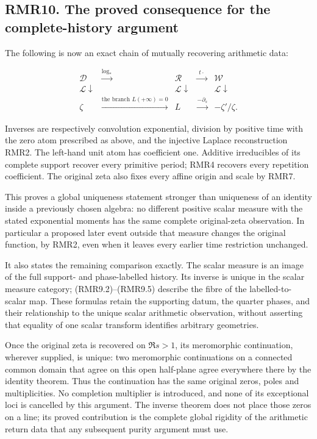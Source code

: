 \subsection{RMR10. The proved consequence for the complete-history
argument}\label{rmr10.-the-proved-consequence-for-the-complete-history-argument}

The following is now an exact chain of mutually recovering arithmetic
data:

\[
\begin{array}{ccccc}
\mathcal D&\xrightarrow{\log_*}&\mathcal R&\xrightarrow{\;t\cdot\;}&\mathcal W\\
\mathcal L\downarrow&&\mathcal L\downarrow&&\mathcal L\downarrow\\
\zeta&\xrightarrow{\text{the branch }L(+\infty)=0}&L
&\xrightarrow{-\partial_s}&-\zeta'/\zeta.
\end{array}
\tag{RMR10.1}
\]

Inverses are respectively convolution exponential, division by positive
time with the zero atom prescribed as above, and the injective Laplace
reconstruction RMR2. The left-hand unit atom has coefficient one.
Additive irreducibles of its complete support recover every primitive
period; RMR4 recovers every repetition coefficient. The original zeta
also fixes every affine origin and scale by RMR7.

This proves a global uniqueness statement stronger than uniqueness of an
identity inside a previously chosen algebra: no different positive
scalar measure with the stated exponential moments has the same complete
original-zeta observation. In particular a proposed later event outside
that measure changes the original function, by RMR2, even when it leaves
every earlier time restriction unchanged.

It also states the remaining comparison exactly. The scalar measure is
an image of the full support- and phase-labelled history. Its inverse is
unique in the scalar measure category; (RMR9.2)--(RMR9.5) describe the
fibre of the labelled-to-scalar map. These formulas retain the
supporting datum, the quarter phases, and their relationship to the
unique scalar arithmetic observation, without asserting that equality of
one scalar transform identifies arbitrary geometries.

Once the original zeta is recovered on \(\Re s>1\), its meromorphic
continuation, wherever supplied, is unique: two meromorphic
continuations on a connected common domain that agree on this open
half-plane agree everywhere there by the identity theorem. Thus the
continuation has the same original zeros, poles and multiplicities. No
completion multiplier is introduced, and none of its exceptional loci is
cancelled by this argument. The inverse theorem does not place those
zeros on a line; its proved contribution is the complete global rigidity
of the arithmetic return data that any subsequent purity argument must
use.
